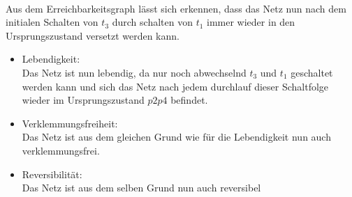 \documentclass[a4paper,12pt]{scrartcl}
\begin{document}
\\
Aus dem Erreichbarkeitsgraph lässt sich erkennen, dass
das Netz nun nach dem initialen Schalten von $t_3$ durch 
schalten von $t_1$ immer wieder in den Ursprungszustand 
versetzt werden kann.
\begin{itemize}
  \item{Lebendigkeit:}\\
    Das Netz ist nun lebendig, da nur noch abwechselnd $t_3$ und $t_1$ geschaltet werden kann und sich das Netz nach jedem durchlauf dieser Schaltfolge wieder im Ursprungszustand $p2p4$ befindet.  
  \item{Verklemmungsfreiheit:}\\
    Das Netz ist aus dem gleichen Grund wie für die 
    Lebendigkeit nun auch verklemmungsfrei.
  \item{Reversibilität:}\\
    Das Netz ist aus dem selben Grund nun auch 
    reversibel

\end{itemize}
\end{document}
